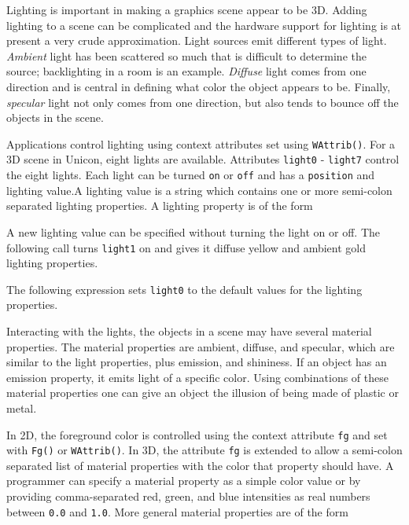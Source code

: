Lighting is important in making a graphics scene appear to be 3D.
Adding lighting to a scene can be complicated and the hardware support
for lighting is at present a very crude approximation. Light sources
emit different types of light. \emph{Ambient} light has been scattered
so much that is difficult to determine the source; backlighting in a
room is an example. \emph{Diffuse} light comes from one direction and
is central in defining what color the object appears to be. Finally,
\emph{specular} light not only comes from one direction, but also
tends to bounce off the objects in the scene.

Applications control lighting using context attributes set using
\texttt{WAttrib()}. For a 3D scene in Unicon, eight lights are
available. Attributes \texttt{light0} - \texttt{light7} control the
eight lights. Each light can be turned \texttt{on} or \texttt{off}
and has a \texttt{position} and lighting value.A lighting value is a
string which contains one or more semi-colon separated lighting
properties. A lighting property is of the form


\noindent
A new lighting value can be specified without turning the light on or off.
The following call turns \texttt{light1} on and gives it diffuse
yellow and ambient gold lighting properties.


\noindent
The following expression sets \texttt{light0} to the default values for
the lighting properties.



Interacting with the lights, the objects in a scene may have several
material properties. The material properties are ambient, diffuse, and
specular, which are similar to the light properties, plus emission,
and shininess. If an object has an emission property, it emits light
of a specific color. Using combinations of these material properties
one can give an object the illusion of being made of plastic or metal.

In 2D, the foreground color is controlled using the context attribute
\texttt{fg} and set with \texttt{Fg()} or \texttt{WAttrib()}.  In 3D,
the attribute \texttt{fg} is extended to allow a semi-colon separated
list of material properties with the color that property should have.
A programmer can specify a material property as a simple color value
or by providing comma-separated red, green, and blue intensities as
real numbers between \texttt{0.0} and \texttt{1.0}.  More general
material properties are of the form


